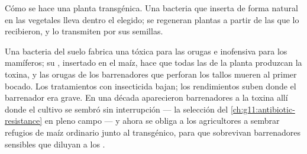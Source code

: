\begin{omfigure}

{\small Cómo se hace una planta transgénica. Una bacteria que inserta
 de forma natural en las  vegetales lleva dentro el 
elegido; se regeneran plantas a partir de las  que lo
recibieron, y lo transmiten por sus semillas.}
\end{omfigure}

\begin{example}\label{ex:g12:domesticated-plants:bt}
Una bacteria del suelo fabrica una  tóxica para las orugas e
inofensiva para los mamíferos; su , insertado en el maíz, hace que
todas las  de la planta produzcan la toxina, y las orugas de los
barrenadores que perforan los tallos mueren al primer bocado. Los
tratamientos con insecticida bajan; los rendimientos suben donde el
barrenador era grave. En una década aparecieron barrenadores
 a la toxina allí donde el cultivo se sembró sin
interrupción --- la selección del
\cref{ch:g11:antibiotic-resistance} en pleno campo --- y ahora se
obliga a los agricultores a sembrar refugios de maíz ordinario junto al
transgénico, para que sobrevivan barrenadores sensibles que diluyan a
los .
\end{example}

